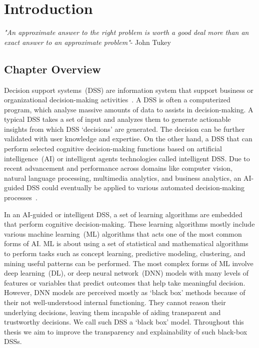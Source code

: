 \chapter{Introduction}
\label{chapter:introduction}
\textit{"An approximate answer to the right problem is worth a good deal more than an exact answer to an approximate problem"}- John Tukey

\section{Chapter Overview}
Decision support systems~(DSS) are information system that support business or organizational decision-making activities~\cite{hackathorn1981organizational}. A DSS is often a computerized program, which analyse massive amounts of data to assists in decision-making. A typical DSS takes a set of input and analyzes them to generate actionable insights from which DSS `decisions' are generated. The decision can be further validated with user knowledge and expertise. On the other hand, a DSS that can perform selected cognitive decision-making functions based on artificial intelligence~(AI) or intelligent agents technologies called intelligent DSS. Due to recent advancement and performance across domains like computer vision, natural language processing, multimedia analytics, and business analytics, an AI-guided DSS could eventually be applied to various automated decision-making processes~\cite{davenport2019potential}. 

\hspace*{3.5mm} In an AI-guided or intelligent DSS, a set of learning algorithms are embedded that perform cognitive decision-making. These learning algorithms mostly include various machine learning~(ML) algorithms that acts one of the most common forms of AI. ML is about using a set of statistical and mathematical algorithms to perform tasks such as concept learning, predictive modeling, clustering, and mining useful patterns can be performed. The most complex forms of ML involve deep learning~(DL), or deep neural network~(DNN) models with many levels of features or variables that predict outcomes that help take meaningful decision. However, DNN models are perceived mostly as `black box' methods because of their not well-understood internal functioning. They cannot reason their underlying decisions, leaving them incapable of aiding transparent and trustworthy decisions. We call such DSS a `black box' model. Throughout this thesis we aim to improve the transparency and explainability of such black-box DSSs. 

